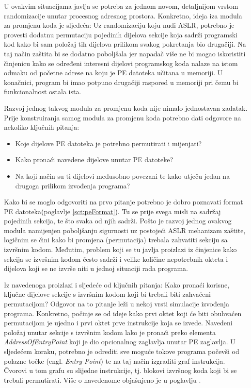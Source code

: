 \documentclass[times, utf8, diplomski, numeric]{fer}
\begin{document}
U ovakvim situacijama javlja se potreba za jednom novom,
detaljnijom vrstom randomizacije unutar procesnog adresnog
prostora. Konkretno, ideja iza modula za promjenu koda je
sljedeća: Uz randomizaciju koju nudi ASLR, potrebno je provesti
dodatnu permutaciju pojedinih dijelova sekcije koja sadrži
programski kod kako bi sam položaj tih dijelova prilikom svakog
pokretanja bio drugačiji. Na taj način zaštita bi se dodatno
poboljšala jer napadač više ne bi mogao iskoristiti činjenicu
kako se određeni interesni dijelovi programskog koda nalaze na			%
istom odmaku od početne adrese na koju je PE datoteka učitana u
memoriji. U konačnici, program bi imao potpuno drugačiji raspored
u memoriji pri čemu bi funkcionalnost ostala ista.

Razvoj jednog takvog modula za promjenu koda nije nimalo
jednostavan zadatak. Prije konstruiranja samog modula za promjenu
koda potrebno dati odgovore na nekoliko ključnih pitanja:

\begin{itemize}
\item Koje dijelove PE datoteka je potrebno permutirati i mijenjati?
\item Kako pronaći navedene dijelove unutar PE datoteke?
\item Na koji način su ti dijelovi međusobno povezani te kako utječu jedan na drugoga prilikom izvođenja programa?
\end{itemize}

Kako bi se moglo odgovoriti na prvo pitanje potrebno je dobro
poznavati format PE datoteka(poglavlje \ref{sct:peFormat}). Tu se		%
prije svega misli na sadržaj pojedinih sekcija, te što svaka od
njih sadrži. Pošto je razvoj jednog ovakvog modula namijenjen
poboljšanju sigurnosti uz postojeći ASLR mehanizam zaštite,
logičnim se čini kako bi promjena (permutacija) trebala zahvatiti
sekciju sa izvršnim kodom. Međutim, problem koji se tu javlja
proizlazi iz činjenice kako sekcija se izvršnim kodom često
sadrži i velike količine nepotrebnih okteta i dijelova koji se ne
izvrše niti u jednoj situaciji rada programa. 

Iz navedenoga proizlazi i sljedeće od ključnih pitanja: Kako
pronaći korisne, ključne dijelove sekcije s izvršnim kodom koji
bi trebali biti zahvaćeni permutacijom? Odgovor na to pitanje
leži u nekoj vrsti simulacije izvođenja programa. Konkretno,
počinje se od ideje kako prvi oktet koji će biti obuhvaćen
permutacijom je ujedno i prvi oktet prve instrukcije koja se
izvede. Navedeni položaj unutar sekcije s izvršnim kodom lako je
pronaći preko elementa \emph{AddressOfEntryPoint} koji je dio
opcionalnog zaglavlja unutar PE zaglavlja. U sljedećem koraku,
potrebno je odrediti sve moguće tokove programa počevši od
polazne točke (engl. \emph{Entry Point}) te na taj način
izgraditi graf instrukcija. Čvorovi u tom grafu su slijedne
instrukcije, tj. blokovi izvršnog koda koji bi se trebali
permutirati. Više o navedenome objašnjeno je u poglavlju
\label{sct:instrucionGraph}.							%
\end{document}
